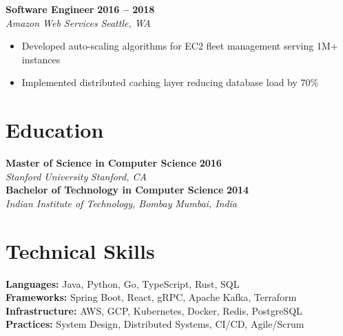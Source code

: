 \documentclass[11pt,letterpaper]{article}
\begin{document}
\noindent\textbf{Software Engineer} \hfill \textbf{2016 -- 2018} \\
\textit{Amazon Web Services} \hfill \textit{Seattle, WA}
\begin{itemize}[leftmargin=1.5em, topsep=2pt, itemsep=1pt]
  \item Developed auto-scaling algorithms for EC2 fleet management serving 1M+ instances
  \item Implemented distributed caching layer reducing database load by 70\%
\end{itemize}

\section{Education}

\noindent\textbf{Master of Science in Computer Science} \hfill \textbf{2016} \\
\textit{Stanford University} \hfill \textit{Stanford, CA} \\[2pt]
\noindent\textbf{Bachelor of Technology in Computer Science} \hfill \textbf{2014} \\
\textit{Indian Institute of Technology, Bombay} \hfill \textit{Mumbai, India}

\section{Technical Skills}

\noindent\textbf{Languages:} Java, Python, Go, TypeScript, Rust, SQL \\
\textbf{Frameworks:} Spring Boot, React, gRPC, Apache Kafka, Terraform \\
\textbf{Infrastructure:} AWS, GCP, Kubernetes, Docker, Redis, PostgreSQL \\
\textbf{Practices:} System Design, Distributed Systems, CI/CD, Agile/Scrum
\end{document}
